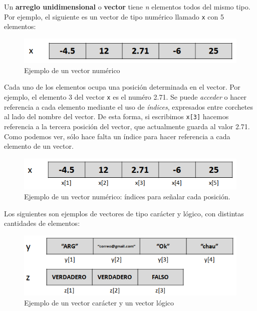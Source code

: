 \documentclass[
]{book}
\begin{document}
Un \textbf{arreglo unidimensional} o \textbf{vector} tiene \emph{n} elementos todos del mismo tipo. Por ejemplo, el siguiente es un vector de tipo numérico llamado \texttt{x} con 5 elementos:

\begin{figure}

{\centering \includegraphics[width=0.6\linewidth]{images/05_estructuras/estr01} 

}

\caption{Ejemplo de un vector numérico}\label{fig:unnamed-chunk-106}
\end{figure}

Cada uno de los elementos ocupa una posición determinada en el vector. Por ejemplo, el elemento 3 del vector \texttt{x} es el numéro 2.71. Se puede \emph{acceder} o hacer referencia a cada elemento mediante el uso de \emph{índices}, expresados entre corchetes al lado del nombre del vector. De esta forma, si escribimos \texttt{x{[}3{]}} hacemos referencia a la tercera posición del vector, que actualmente guarda al valor 2.71. Como podemos ver, sólo hace falta un índice para hacer referencia a cada elemento de un vector.

\begin{figure}

{\centering \includegraphics[width=0.6\linewidth]{images/05_estructuras/estr02} 

}

\caption{Ejemplo de un vector numérico: índices para señalar cada posición.}\label{fig:unnamed-chunk-107}
\end{figure}

Los siguientes son ejemplos de vectores de tipo carácter y lógico, con distintas cantidades de elementos:

\begin{figure}

{\centering \includegraphics[width=0.6\linewidth]{images/05_estructuras/estr03} 

}

\caption{Ejemplo de un vector carácter y un vector lógico}\label{fig:unnamed-chunk-108}
\end{figure}
\end{document}
